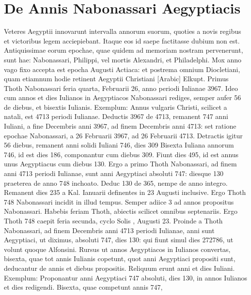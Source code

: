 \section{De Annis Nabonassari Aegyptiacis}
%
Veteres Aegyptii innovarunt intervalla annorum suorum,
quoties a novis regibus et victoribus legem acciepiebant.
Itaque
eos id saepe factitasse dubium non est.
Antiquissimae eorum
epochae, quae quidem ad memoriam nostram pervenerunt,
sunt hae: Nabonassari, Philippi, vel mortis Alexandri, et Philadelphi.
Mox anno vago fixo accepta est epocha Augusti Actiaca: et
postrema omnium Diocletiani, quam etiamnum hodie retinent
Aegyptii Christiani \textarabic{}[Arabic] Elkupt.
Primus Thoth Nabonassari feria
quarta, Februarii 26, anno periodi Iulianae 3967.
Ideo cum
annos et dies Iulianos in Aegyptiacos Nabonassari rediges, semper
aufer 56 de diebus, et bisextis Iulianis.
Exemplum: Annus vulgaris
Christi, scilicet a natali, est 4713 periodi Iulianae.
Deductis
3967 de 4713, remanent 747 anni Iuliani, a fine Decembris anni
3967, ad finem Decembris anni 4713: set ratione epochae Nabonassari,
a 26 Februarii 3967, ad 26 Februarii 4713.
Detractis
igitur 56 diebus, remanent anni solidi Iuliani 746, dies 309
Bisexta Iuliana annorum 746, id est dies 186, componantur cum
diebus 309.
Fiunt dies 495, id est annus unus Aegyptiacus cum diebus
130.
%
Ergo a primo Thoth Nabonassari, ad finem anni 4713 periodi
Iulianae, sunt anni Aegyptiaci absoluti 747: diesque 130 praeterea
de anno 748 inchoato.
Deduc 130 de 365, nempe de anno
integro.
Remanent dies 235 a Kal. Ianuarii definentes in 23 Augusti
inclusive.
Ergo Thoth 748 Nabonassari incidit in illud tempus.
Semper adiice 3 ad annos propositus Nabonassari.
Habebis feriam
Thoth, abiectis scilicet omnibus septenariis.
Ergo Thoth 748
caepit feria secunda, cyclo Solis , Augusti 23.
Proinde a Thoth
Nabonassari, ad finem Decembris anni 4713 periodi Iulianae, anni
sunt Aegyptiaci, ut diximus, absoluti 747, dies 130: qui fiunt
simul dies 272786, ut volunt quoque Alfonsini.
Rursus ut annos
Aegyptiacos in Iulianos convertas, bisexta, quae tot annis Iulianis
copetunt, quot anni Aegyptiaci propositi sunt, deducantur de annis
et diebus propositis.
Reliquum erunt anni et dies Iuliani.
Exemplum:
Proponantur anni Aegyptiaci 747 absoluti, dies 130, in annos
Iulianos et dies redigendi.
Bisexta, quae competunt annis 747,
